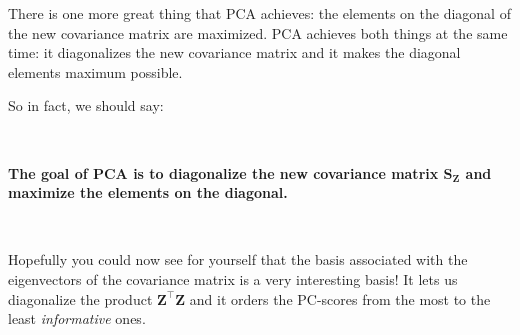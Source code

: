 \documentclass[10pt,twocolumn]{article}
\begin{document}
There is one more great thing that PCA achieves: the elements on the diagonal of the new covariance matrix are maximized. PCA achieves both things at the same time: it diagonalizes the new covariance matrix and it makes the diagonal elements maximum possible.

So in fact, we should say:

\,\,

\textbf{The goal of PCA is to diagonalize the new covariance matrix $\mathbf{S_Z}$ and maximize the elements on the diagonal.}

\,\,

Hopefully you could now see for yourself that the basis associated with the eigenvectors of the covariance matrix is a very interesting basis! It lets us diagonalize the product $\mathbf{Z}^{\top} \mathbf{Z}$ and it orders the PC-scores from the most to the least \textit{informative} ones.

%
%
\end{document}
